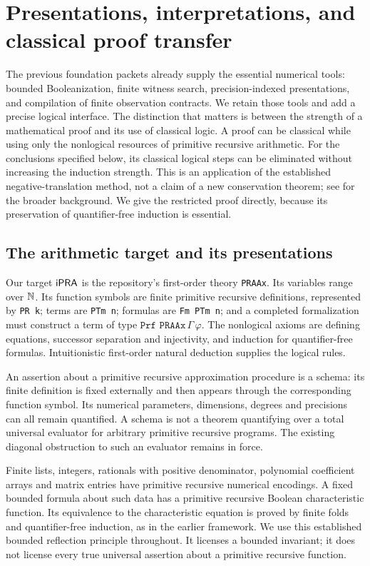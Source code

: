 \section{Presentations, interpretations, and classical proof transfer}
\label{sec:logic}

The previous foundation packets already supply the essential numerical
tools: bounded Booleanization, finite witness search, precision-indexed
presentations, and compilation of finite observation contracts. We retain
those tools and add a precise logical interface. The distinction that matters
is between the strength of a mathematical proof and its use of classical
logic. A proof can be classical while using only the nonlogical resources of
primitive recursive arithmetic. For the conclusions specified below, its
classical logical steps can be eliminated without increasing the induction
strength. This is an application of the established negative-translation
method, not a claim of a new conservation theorem; see
\cite{moschovakis} for the broader background. We give the restricted proof
directly, because its preservation of quantifier-free induction is essential.

\subsection{The arithmetic target and its presentations}

Our target \(\mathsf{iPRA}\) is the repository's first-order theory
\texttt{PRAAx}. Its variables range over \(\mathbb N\). Its function symbols are
finite primitive recursive definitions, represented by \texttt{PR k}; terms
are \texttt{PTm n}; formulas are \texttt{Fm PTm n}; and a completed
formalization must construct a term of type
\(\texttt{Prf PRAAx}\,\Gamma\,\varphi\).
The nonlogical axioms are defining equations, successor separation and
injectivity, and induction for quantifier-free formulas. Intuitionistic
first-order natural deduction supplies the logical rules.

An assertion about a primitive recursive approximation procedure is a
schema: its finite definition is fixed externally and then appears through
the corresponding function symbol. Its numerical parameters, dimensions,
degrees and precisions can all remain quantified. A schema is not a theorem
quantifying over a total universal evaluator for arbitrary primitive recursive
programs. The existing diagonal obstruction to such an evaluator remains in
force.

Finite lists, integers, rationals with positive denominator, polynomial
coefficient arrays and matrix entries have primitive recursive numerical
encodings. A fixed bounded formula about such data has a primitive recursive
Boolean characteristic function. Its equivalence to the characteristic
equation is proved by finite folds and quantifier-free induction, as in the
earlier framework. We use this established bounded reflection principle
throughout. It licenses a bounded invariant; it does not license every true
universal assertion about a primitive recursive function.


